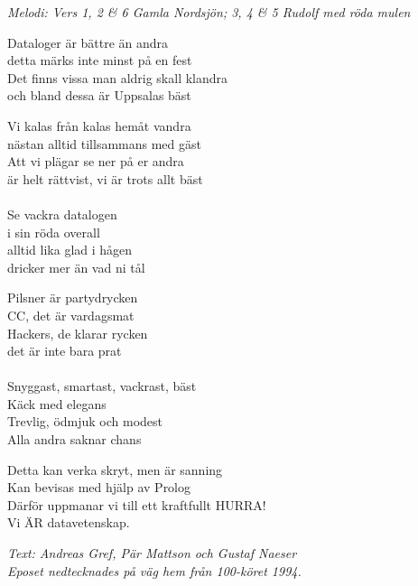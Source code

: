 {\footnotesize\textit{Melodi: Vers 1, 2 \& 6 Gamla Nordsjön; 3, 4 \& 5 Rudolf med röda mulen}}\par
\vspace{10pt}
Dataloger är bättre än andra\\
detta märks inte minst på en fest\\
Det finns vissa man aldrig skall klandra\\
och bland dessa är Uppsalas bäst\par
\vspace{10pt}
Vi kalas från kalas hemåt vandra\\
nästan alltid tillsammans med gäst\\
Att vi plägar se ner på er andra\\
är helt rättvist, vi är trots allt bäst\\
\\
Se vackra datalogen\\
i sin röda overall\\
alltid lika glad i hågen\\
dricker mer än vad ni tål\par
\vspace{10pt}
Pilsner är partydrycken\\
CC, det är vardagsmat\\
Hackers, de klarar rycken\\
det är inte bara prat\\
\\
Snyggast, smartast, vackrast, bäst\\
Käck med elegans\\
Trevlig, ödmjuk och modest\\
Alla andra saknar chans\par
\vspace{10pt}
Detta kan verka skryt, men är sanning\\
Kan bevisas med hjälp av Prolog\\
Därför uppmanar vi till ett kraftfullt HURRA!\\
Vi ÄR datavetenskap.
\par
\vspace{10pt}
{\footnotesize\textit{Text: Andreas Gref, Pär Mattson och Gustaf Naeser\\
Eposet nedtecknades på väg hem från 100-köret 1994.}}
